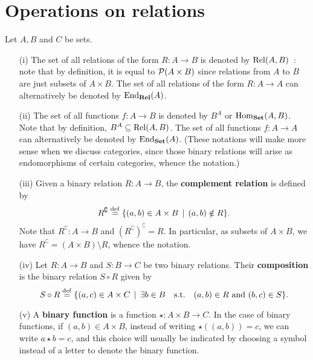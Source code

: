 \section{Operations on relations} \label{operations-on-relations}

\begin{definition}
	Let $A,B$ and $C$ be sets.
	\begin{itemize}
		\item[(i)] The set of all relations of the form $R : A \to B$ is denoted by $\mathrm{Rel}(A,B)$~: note that by definition, it is equal to $\operatorname{\mathcal P}(A \times B)$ since relations from $A$ to $B$ are just subsets of $A \times B$. The set of all relations of the form $R : A \to A$ can alternatively be denoted by $\operatorname{\mathrm{End}}_{\mathbf{Rel}}(A)$. 
		\\

		\item[(ii)] The set of all functions $f: A \to B$ is denoted by $B^A$ or $\mathrm{Hom}_{\mathbf{Set}}(A,B)$. Note that by definition, $B^A \subseteq \mathrm{Rel}(A,B)$. The set of all functions $f : A \to A$ can alternatively be denoted by $\operatorname{\mathrm{End}}_{\mathbf{Set}}(A)$. (These notations will make more sense when we discuss categories, since those binary relations will arise as endomorphisms of certain categories, whence the notation.)
		\\

		\item[(iii)] Given a binary relation $R: A \to B$, the \textbf{complement relation} is defined by
		\[
			R^{\complement} \overset{\mathrm{def}}{=} \{ (a,b) \in A \times B \, \mid \, (a,b) \notin R \}.
		\]
		Note that $R^{\complement} : A \to B$ and $(R^{\complement})^{\complement} = R$. In particular, as subsets of $A \times B$, we have $R^{\complement} = (A \times B) \setminus R$, whence the notation.
		\\

		\item[(iv)] Let $R : A \to B$ and $S: B \to C$ be two binary relations. Their \textbf{composition} is the binary relation $S \circ R$ given by 
		\[
				S \circ R \overset{\mathrm{def}}{=} \{ (a,c) \in A \times C \, \mid \, \exists b \in B \quad \text{s.t.} \quad (a,b) \in R \text{ and } (b,c) \in S \}.
		\]

		\item[(v)] A \textbf{binary function} is a function $\star : A \times B \to C$. In the case of binary functions, if $(a,b) \in A \times B$, instead of writing $\star((a,b)) = c$, we can write $a \star b = c$, and this choice will usually be indicated by choosing a symbol instead of a letter to denote the binary function.
		\\
	\end{itemize}
\end{definition}

